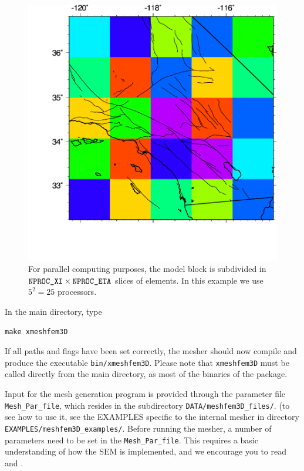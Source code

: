 \begin{figure}[htbp]
\noindent \begin{centering}
\includegraphics[scale=0.5]{figures/socal_map_mpi.pdf}
\par\end{centering}

\caption{For parallel computing purposes,
the model block is subdivided in $\mbox{\texttt{NPROC\_XI\/}}\times\mbox{\texttt{NPROC\_ETA\/}}$ slices
of elements. In this example we use $5^{2}=25$ processors. }
\label{fig:For-parallel-computing}
\end{figure}


\noindent
In the main directory, type
{\small
\begin{verbatim}
make xmeshfem3D
\end{verbatim}
}
If all paths and flags have been set correctly, the mesher should
now compile and produce the executable \texttt{bin/xmeshfem3D}. Please
note that \texttt{xmeshfem3D} must be called directly from the main
directory, as most of the binaries of the package.

Input for the mesh generation program is provided through the parameter
file \texttt{Mesh\_Par\_file}, which resides in the subdirectory \texttt{DATA/meshfem3D\_files/}.
(to see how to use it, see the EXAMPLES specific to the internal mesher in directory \texttt{EXAMPLES/meshfem3D\_examples/}.
Before running the mesher, a number of parameters need to be set in
the \texttt{Mesh\_Par\_file}. This requires a basic understanding
of how the SEM is implemented, and we encourage you to read \citet{KoVi98,KoTr99}
and \citet{KoLiTrSuStSh04}.

